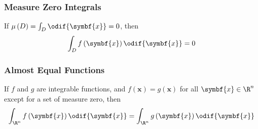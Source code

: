 \documentclass{article}
\begin{document}
\subsubsection*{Measure Zero Integrals}
If \(\mu\left( D \right) = \int_D \odif{\symbf{x}} = 0\), then
\begin{equation*}
    \int_D f\left( \symbf{x} \right) \odif{\symbf{x}} = 0
\end{equation*}
\subsubsection*{Almost Equal Functions}
If \(f\) and \(g\) are integrable functions, and \(f\left( \symbf{x}
\right) = g\left( \symbf{x} \right)\) for all \(\symbf{x} \in \R^n\)
except for a set of measure zero, then
\begin{equation*}
    \int_{\R^n} f\left( \symbf{x} \right) \odif{\symbf{x}} = \int_{\R^n} g\left( \symbf{x} \right) \odif{\symbf{x}}
\end{equation*}
\end{document}
